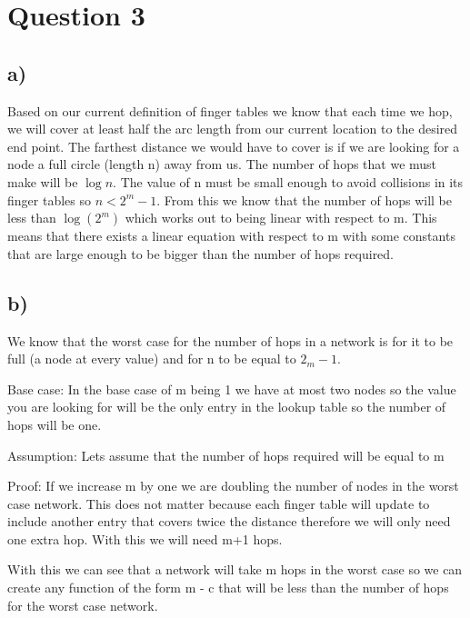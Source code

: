 \documentclass[12pt]{article}
\begin{document}


\section{Question 3} %
\label{sec:question_3}

\subsection{a)} %
\label{sub:a_}
Based on our current definition of finger tables we know that each time we hop, we will cover at least half the arc length from our current location to the desired end point. The farthest distance we would have to cover is if we are looking for a node a full circle (length n) away from us. The number of hops that we must make will be $\log n$. The value of n must be small enough to avoid collisions in its finger tables so $n < 2^m -1$. From this we know that the number of hops will be less than $\log(2^m)$ which works out to being linear with respect to m. This means that there exists a linear equation with respect to m with some constants that are large enough to be bigger than the number of hops required.

\subsection{b)} %
\label{sub:b_}
We know that the worst case for the number of hops in a network is for it to be full (a node at every value) and for n to be equal to $2_m-1$.

Base case: In the base case of m being 1 we have at most two nodes so the value you are looking for will be the only entry in the lookup table so the number of hops will be one.

Assumption: Lets assume that the number of hops required will be equal to m

Proof: If we  increase m by one we are doubling the number of nodes in the worst case network. This does not matter because each finger table will update to include another entry that covers twice the distance therefore we will only need one extra hop. With this we will need m+1 hops.

With this we can see that a network will take m hops in the worst case so we can create any function of the form m - c that will be less than the number of hops for the worst case network.

\end{document}
